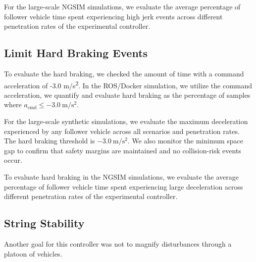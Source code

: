 \documentclass[conference]{IEEEtran}
\begin{document}
For the large-scale NGSIM simulations, we evaluate the average percentage of follower vehicle time spent experiencing high jerk events across different penetration rates of the experimental controller.

\subsection{Limit Hard Braking Events}

To evaluate the hard braking, we checked the amount of time with a command acceleration of -3.0 m/s\textsuperscript{2}. 
In the ROS/Docker simulation, we utilize the command acceleration, we quantify and evaluate hard braking as the percentage of samples where \(a_{\mathrm{cmd}} \le -3.0~\mathrm{m/s^2}\).

For the large-scale synthetic simulations, we evaluate the maximum deceleration experienced by any follower vehicle across all scenarios and penetration rates. The hard braking threshold is $-3.0~\mathrm{m/s^2}$. We also monitor the minimum space gap to confirm that safety margins are maintained and no collision-risk events occur.

To evaluate hard braking in the NGSIM simulations, we evaluate the average percentage of follower vehicle time spent experiencing large deceleration across different penetration rates of the experimental controller.

\subsection{String Stability}

Another goal for this controller was not to magnify disturbances through a platoon of vehicles. 
\end{document}

